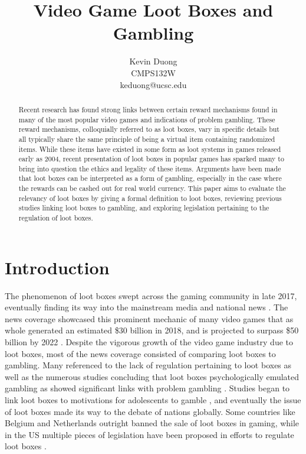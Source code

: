 \documentclass[11pt]{article}
\begin{document}
\title{Video Game Loot Boxes and Gambling}
 
\author{Kevin Duong\\
CMPS132W\\
keduong@ucsc.edu}

\date{}
 
\maketitle 
 
\begin{abstract}

Recent research has found strong links between certain reward mechanisms 
found in many of the most popular video games and indications of problem gambling. 
These reward mechanisms, colloquially referred to as loot boxes,
 vary in specific details but all typically share the same principle of 
being a virtual item containing randomized items. 
While these items have existed in some form as loot systems in games
released early as 2004, recent presentation of loot boxes in popular games 
has sparked many to bring into question the ethics and legality of these items. 
Arguments have been made that loot boxes can be interpreted as a form of gambling, 
especially in the case where the rewards can be cashed out for real world currency.
This paper aims to evaluate the relevancy of loot boxes by giving a formal 
definition to loot boxes, reviewing previous studies linking loot boxes to gambling,
and exploring legislation pertaining to the regulation of loot boxes.
\end{abstract}
 
 
 
\section{Introduction}\label{intro-sect}

The phenomenon of loot boxes swept across the gaming community 
in late 2017, eventually finding its way into the mainstream media and national
news \cite{pu_28AD}. The news coverage showcased this prominent mechanic of many video games 
that as whole generated an estimated \$30 billion in 2018, and is projected to surpass \$50 billion
by 2022 \cite{juniper2018}. Despite the vigorous growth of the video game industry due to loot boxes, 
most of the news coverage consisted of comparing loot boxes to gambling. Many referenced to 
the lack of regulation pertaining to loot boxes as well as the numerous studies 
concluding that loot boxes psychologically emulated gambling \cite{Drummond2018} as 
showed significant links with problem gambling \cite{zd01}. Studies began to link loot boxes
to motivations for adolescents to gamble \cite{zendle_meyer_over_2019}, and eventually the issue
of loot boxes made its way to the debate of nations globally. Some countries like Belgium and
Netherlands outright banned the sale of loot boxes in gaming, while in the US multiple pieces of legislation
have been proposed in efforts to regulate loot boxes \cite{yin-poole_2018} . 
\end{document}
